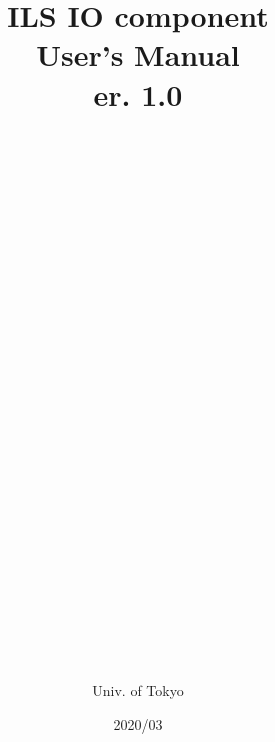 \documentclass[12pt,a4paper]{report}
\begin{document}
\title{
ILS IO component\\
User's Manual\\
er. 1.0\\
\\
\\
\\
\\
\\
\\
\\
\\
\\
\\
\\
\\
\\
\\
}

\date{2020/03}

\author{Univ. of Tokyo}



\maketitle
\tableofcontents
	
	
\end{document}
